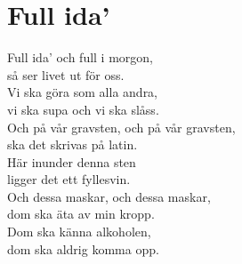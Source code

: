 \section{Full ida'}
Full ida' och full i morgon,\\
så ser livet ut för oss.\\
Vi ska göra som alla andra,\\
vi ska supa och vi ska slåss.\\

Och på vår gravsten, och på vår gravsten,\\
ska det skrivas på latin.\\
Här inunder denna sten\\
ligger det ett fyllesvin.\\

Och dessa maskar, och dessa maskar,\\
dom ska äta av min kropp.\\
Dom ska känna alkoholen,\\
dom ska aldrig komma opp.\\